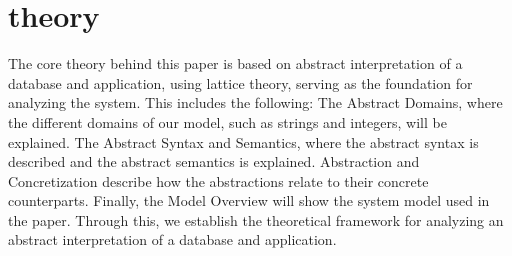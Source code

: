 \section{theory}\label{theory}
The core theory behind this paper is based on abstract interpretation of a database and application, using lattice theory, serving as the foundation for analyzing the system.
This includes the following:
The Abstract Domains, where the different domains of our model, such as strings and integers, will be explained.
The Abstract Syntax and Semantics, where the abstract syntax is described and the abstract semantics is explained.
Abstraction and Concretization describe how the abstractions relate to their concrete counterparts.
Finally, the Model Overview will show the system model used in the paper.
Through this, we establish the theoretical framework for analyzing an abstract interpretation of a database and application.







